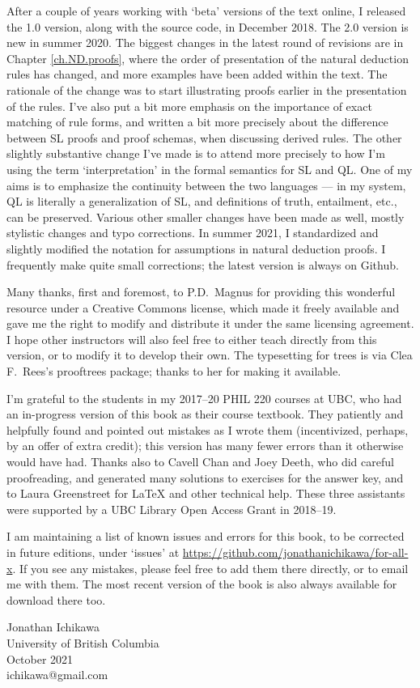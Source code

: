 After a couple of years working with `beta' versions of the text online, I released the 1.0 version, along with the source code, in December 2018. The 2.0 version is new in summer 2020. The biggest changes in the latest round of revisions are in Chapter \ref{ch.ND.proofs}, where the order of presentation of the natural deduction rules has changed, and more examples have been added within the text. The rationale of the change was to start illustrating proofs earlier in the presentation of the rules. I've also put a bit more emphasis on the importance of exact matching of rule forms, and written a bit more precisely about the difference between SL proofs and proof schemas, when discussing derived rules. The other slightly substantive change I've made is to attend more precisely to how I'm using the term `interpretation' in the formal semantics for SL and QL. One of my aims is to emphasize the continuity between the two languages --- in my system, QL is literally a generalization of SL, and definitions of truth, entailment, etc., can be preserved. Various other smaller changes have been made as well, mostly stylistic changes and typo corrections. In summer 2021, I standardized and slightly modified the notation for assumptions in natural deduction proofs. I frequently make quite small corrections; the latest version is always on Github.

Many thanks, first and foremost, to P.D.\ Magnus for providing this wonderful resource under a Creative Commons license, which made it freely available and gave me the right to modify and distribute it under the same licensing agreement. I hope other instructors will also feel free to either teach directly from this version, or to modify it to develop their own. The typesetting for trees is via Clea F.\ Rees's prooftrees package; thanks to her for making it available.

I'm grateful to the students in my 2017--20 PHIL 220 courses at UBC, who had an in-progress version of this book as their course textbook. They patiently and helpfully found and pointed out mistakes as I wrote them (incentivized, perhaps, by an offer of extra credit); this version has many fewer errors than it otherwise would have had. Thanks also to Cavell Chan and Joey Deeth, who did careful proofreading, and generated many solutions to exercises for the answer key, and to Laura Greenstreet for LaTeX and other technical help. These three assistants were supported by a UBC Library Open Access Grant in 2018--19.

I am maintaining a list of known issues and errors for this book, to be corrected in future editions, under `issues' at \url{https://github.com/jonathanichikawa/for-all-x}. If you see any mistakes, please feel free to add them there directly, or to email me with them. The most recent version of the book is also always available for download there too.

\begin{flushright}
Jonathan Ichikawa \\
University of British Columbia \\
October 2021 \\
ichikawa@gmail.com
\end{flushright}

\fi

